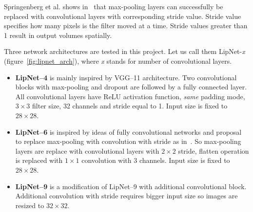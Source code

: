\documentclass[a4paper, 11pt, table]{article}
\begin{document}
Springenberg et al. shows in~\cite{DBLP:journals/corr/SpringenbergDBR14} that max-pooling layers can successfully be replaced with convolutional layers with corresponding stride value. Stride value specifies how many pixels is the filter moved at a time. Stride values greater than 1 result in output volumes spatially. 

Three network architectures are tested in this project. Let us call them LipNet-\textit{x} (figure~\ref{fig:lipnet_arch}), where \textit{x} stands for number of convolutional layers. 

\begin{itemize}
\item \textbf{LipNet--4} is mainly inspired by VGG--11 architecture. Two convolutional blocks with max-pooling and dropout are followed by a fully connected layer. All convolutional layers have ReLU activation function, \textit{same} padding mode, $3 \times 3$ filter size, 32 channels and stride equal to 1. Input size is fixed to $28 \times 28$.

\item \textbf{LipNet--6} is inspired by ideas of fully convolutional networks and proposal to replace max-pooling with convolution with stride as in~\cite{DBLP:journals/corr/SpringenbergDBR14}. So max-pooling layers are replace with convolutional layers with $2 \times 2$ stride, flatten operation is replaced with $1 \times 1$ convolution with $3$ channels. Input size is fixed to $28 \times 28$.

\item \textbf{LipNet--9} is a modification of LipNet--9 with additional convolutional block. Additional convolution with stride requires bigger input size so images are resized to $32 \times 32$. 
\end{itemize}
\end{document}
